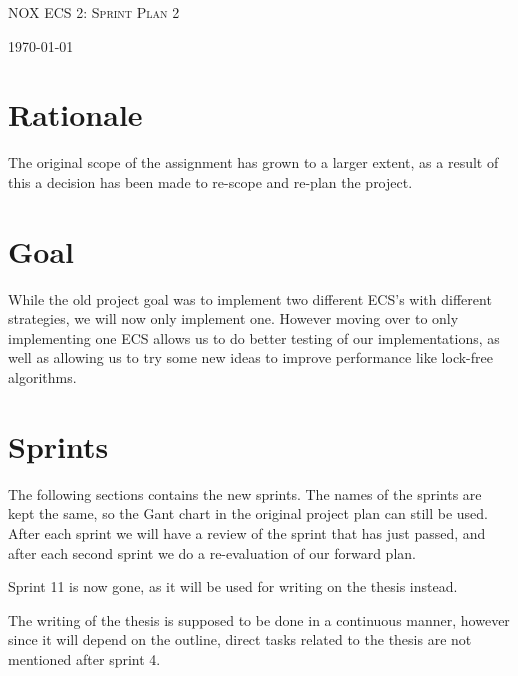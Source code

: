 \documentclass[hidelinks]{article}
\begin{document}
\begin{titlepage}
    \centering
    {\scshape\LARGE NOX ECS 2: Sprint Plan 2 \par}
    \vfill
    {\large \today\par}
\end{titlepage}

\tableofcontents
\pagebreak

\section{Rationale}
The original scope of the assignment has grown to a larger extent, as a result of this a decision has been made to re-scope and re-plan the project.


\section{Goal}
While the old project goal was to implement two different ECS's with different strategies, we will now only implement one.
However moving over to only implementing one ECS allows us to do better testing
of our implementations, as well as allowing us to try some new ideas to improve performance like lock-free algorithms.

\section{Sprints}
The following sections contains the new sprints. The names of the sprints are kept the same, so the Gant chart in the original project plan can still be used.
After each sprint we will have a review of the sprint that has just passed, and after each second sprint we do a re-evaluation of our forward plan.

Sprint 11 is now gone, as it will be used for writing on the thesis instead.

The writing of the thesis is supposed to be done in a continuous manner, however since it will depend on the outline, 
direct tasks related to the thesis are not mentioned after sprint 4.
\end{document}

